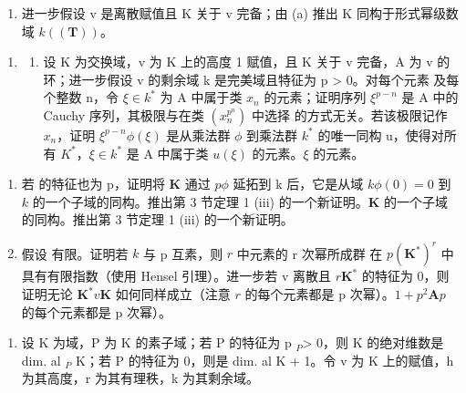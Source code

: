 \begin{enumerate}
\def\labelenumi{(\alph{enumi})}
\setcounter{enumi}{1}
\tightlist
\item
  进一步假设 v 是离散赋值且 K 关于 v 完备；由 (a) 推出 K 同构于形式幂级数域 \(k((\mathbf{T}))\)。
\end{enumerate}

\begin{enumerate}
\def\labelenumi{\arabic{enumi}.}
\setcounter{enumi}{4}
\tightlist
\item
  \begin{enumerate}
  \def\labelenumii{(\alph{enumii})}
  \tightlist
  \item
    设 K 为交换域，v 为 K 上的高度 1 赋值，且 K 关于 v 完备，A 为 v 的环；进一步假设 v 的剩余域 k 是完美域且特征为 p \textgreater{} 0。对每个元素  及每个整数 n，令 \(\xi \in k^{*}\) 为 A 中属于类 \(x_{n}\) 的元素；证明序列 \(\xi^{p-n}\) 是 A 中的 Cauchy 序列，其极限与在类 \((x_{n}^{p^{n}})\) 中选择  的方式无关。若该极限记作 \(x_{n}\)，证明 \(\xi^{p-n}\)\(\phi(\xi)\) 是从乘法群 \(\phi\) 到乘法群 \(k^{*}\) 的唯一同构 u，使得对所有 \(K^{*}\)，\(\xi \in k^{*}\) 是 A 中属于类 \(u(\xi)\) 的元素。\(\xi\) 的元素。
  \end{enumerate}
\end{enumerate}

\begin{enumerate}
\def\labelenumi{(\alph{enumi})}
\setcounter{enumi}{1}
\item
  若  的特征也为 p，证明将 \(\mathbf{K}\) 通过 \(p\)\(\phi\) 延拓到 k 后，它是从域 \(k\)\(\phi(0) = 0\) 到 \(k\) 的一个子域的同构。推出第 3 节定理 1 (iii) 的一个新证明。\(\mathbf{K}\) 的一个子域的同构。推出第 3 节定理 1 (iii) 的一个新证明。
\item
  假设  有限。证明若 \(k\) 与 p 互素，则 \(r\) 中元素的 r 次幂所成群  在 \(p\)\((\mathbf{K}^*)^r\) 中具有有限指数（使用 Hensel 引理）。进一步若 v 离散且 \(r\)\(\mathbf{K}^*\) 的特征为 0，则证明无论 \(\mathbf{K}^*\)\(v\)\(\mathbf{K}\) 如何同样成立（注意 \(r\) 的每个元素都是 p 次幂）。\(1 + p^2\mathbf{A}\)\(p\) 的每个元素都是 p 次幂）。
\end{enumerate}


\begin{enumerate}
\def\labelenumi{\arabic{enumi}.}
\tightlist
\item
  设 K 为域，P 为 K 的素子域；若 P 的特征为 p \(_{P}\)\textgreater{} 0，则 K 的绝对维数是 dim. al \(_{P}\) K；若 P 的特征为 0，则是 dim. al  K + 1。令 v 为 K 上的赋值，h 为其高度，r 为其有理秩，k 为其剩余域。
\end{enumerate}

